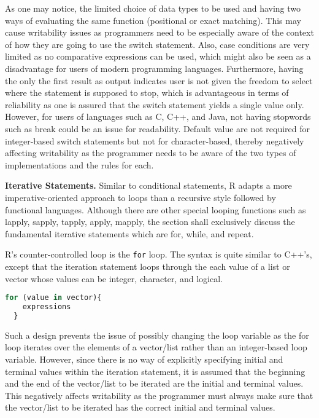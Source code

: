 \documentclass[12pt]{article}
\begin{document}
As one may notice, the limited choice of data types to be used and having two ways of evaluating the same function (positional or exact matching). This may cause writability issues as programmers need to be especially aware of the context of how they are going to use the switch statement. Also, case conditions are very limited as no comparative expressions can be used, which might also be seen as a disadvantage for users of modern programming languages. Furthermore, having the only the first result as output indicates user is not given the freedom to select where the statement is supposed to stop, which is advantageous in terms of reliability as one is assured that the switch statement yields a single value only. However, for users of languages such as C, C++, and Java, not having stopwords such as break could be an issue for readability. Default value are not required for  integer-based switch statements but not for character-based, thereby negatively affecting writability as the programmer needs to be aware of the two types of implementations and the rules for each.

\textbf{Iterative Statements.} Similar to conditional statements, R adapts a more imperative-oriented approach to loops than a recursive style followed by functional languages. Although there are other special looping functions such as lapply, sapply, tapply, apply, mapply, the section shall exclusively discuss the fundamental iterative statements which are for, while, and repeat.

R's counter-controlled loop is the \texttt{for} loop. The syntax is quite similar to C++'s, except that the iteration statement loops through the each value of a list or vector whose values can be integer, character, and logical.

\begin{lstlisting}[language=R ]
  for (value in vector){
    expressions
  }
\end{lstlisting}

Such a design prevents the issue of possibly changing the loop variable as the for loop iterates over the elements of a vector/list rather than an integer-based loop variable. However, since there is no way of explicitly specifying initial and terminal values within the iteration statement, it is assumed that the beginning and the end of the vector/list to be iterated are the initial and terminal values. This negatively affects writability as the programmer must always make sure that the vector/list to be iterated has the correct initial and terminal values.
\end{document}
